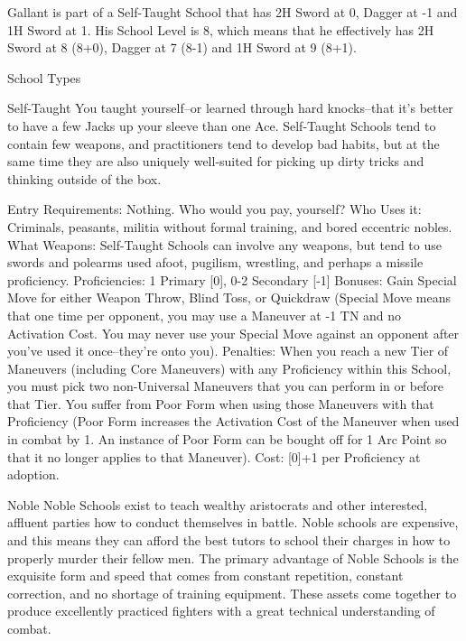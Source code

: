 \documentclass[oneside,11pt,english]{book}
\begin{document}
 

Gallant is part of a Self-Taught School that has 2H Sword at 0, Dagger at -1 and 1H Sword at 1. His 
School Level is 8, which means that he effectively has 2H Sword at 8 (8+0), Dagger at 7 (8-1) and 1H 
Sword at 9 (8+1). 


 

School Types 

 

Self-Taught 
You taught yourself--or learned through hard knocks--that it’s better to have a few Jacks up your sleeve 
than one Ace. Self-Taught Schools tend to contain few weapons, and practitioners tend to develop bad 
habits, but at the same time they are also uniquely well-suited for picking up dirty tricks and thinking 
outside of the box. 

 

Entry Requirements: Nothing. Who would you pay, yourself? 
Who Uses it: Criminals, peasants, militia without formal training, and bored eccentric nobles. 
What Weapons: Self-Taught Schools can involve any weapons, but tend to use swords and polearms 
used afoot, pugilism, wrestling, and perhaps a missile proficiency. 
Proficiencies: 1 Primary [0], 0-2 Secondary [-1] 
Bonuses: Gain Special Move for either Weapon Throw, Blind Toss, or Quickdraw (Special Move means 
that one time per opponent, you may use a Maneuver at -1 TN and no Activation Cost. You may never 
use your Special Move against an opponent after you’ve used it once--they’re onto you). 
Penalties: When you reach a new Tier of Maneuvers (including Core Maneuvers) with any Proficiency 
within this School, you must pick two non-Universal Maneuvers that you can perform in or before that 
Tier. You suffer from Poor Form when using those Maneuvers with that Proficiency (Poor Form 
increases the Activation Cost of the Maneuver when used in combat by 1. An instance of Poor Form can 
be bought off for 1 Arc Point so that it no longer applies to that Maneuver). 
Cost: [0]+1 per Proficiency at adoption. 

 

Noble 
Noble Schools exist to teach wealthy aristocrats and other interested, affluent parties how to conduct 
themselves in battle. Noble schools are expensive, and this means they can afford the best tutors to school 
their charges in how to properly murder their fellow men. The primary advantage of Noble Schools is the 
exquisite form and speed that comes from constant repetition, constant correction, and no shortage of 
training equipment. These assets come together to produce excellently practiced fighters with a great 
technical understanding of combat. 
\end{document}
